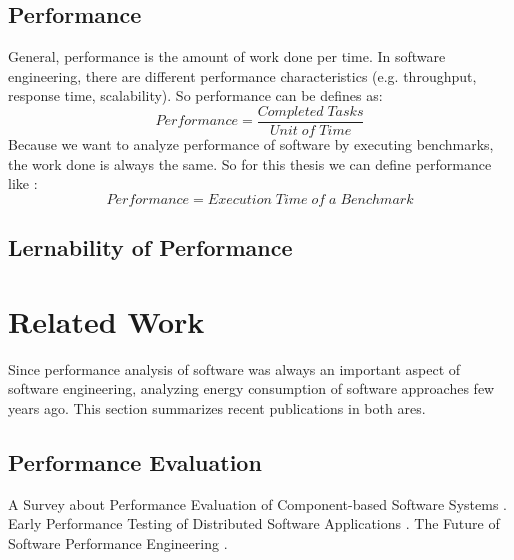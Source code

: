 \subsection{Performance}
\label{background_perf}

General, performance is the amount of work done per time\cite{tsirogiannis2010analyzing}. In software engineering, there are different performance characteristics (e.g. throughput, response time, scalability). So performance can be defines as:
\begin{equation}
\label{def:perf1}
	Performance=\frac{Completed\;Tasks}{Unit\;of\;Time}
\end{equation}
Because we want to analyze performance of software by executing benchmarks, the work done is always the same. So for this thesis we can define performance like \cite{siegmund2015performance}:
\begin{equation}
\label{def:perf2}
	Performance=Execution\;Time\;of\;a\;Benchmark
\end{equation}


\subsection{Lernability of Performance}
\label{background_perf_pred}




\section{Related Work}
\label{rel_work}

Since performance analysis of software was always an important aspect of software engineering, analyzing energy consumption of software approaches few years ago. This section summarizes recent publications in both ares. 

\subsection{Performance Evaluation}
\label{rel_perf}

A Survey about Performance Evaluation of Component-based Software Systems \cite{koziolek2010performance}.
Early Performance Testing of Distributed Software Applications \cite{denaro2004early}.
The Future of Software Performance Engineering \cite{woodside2007future}.

